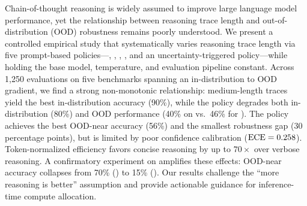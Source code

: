 Chain-of-thought reasoning is widely assumed to improve large language model performance, yet the relationship between reasoning trace length and out-of-distribution (OOD) robustness remains poorly understood. We present a controlled empirical study that systematically varies reasoning trace length via five prompt-based policies---\pnone, \pshort, \pmedium, \plong, and an uncertainty-triggered \padaptive policy---while holding the base model, temperature, and evaluation pipeline constant. Across 1,250 evaluations on five benchmarks spanning an in-distribution to OOD gradient, we find a strong non-monotonic relationship: medium-length traces yield the best in-distribution accuracy (90\%), while the \plong policy degrades both in-distribution (80\%) and OOD performance (40\% on \mathfive vs.\ 46\% for \pshort). The \padaptive policy achieves the best OOD-near accuracy (56\%) and the smallest robustness gap (30 percentage points), but is limited by poor confidence calibration ($\text{ECE} = 0.258$). Token-normalized efficiency favors concise reasoning by up to $70\times$ over verbose reasoning. A confirmatory experiment on \mini amplifies these effects: OOD-near accuracy collapses from 70\% (\pshort) to 15\% (\plong). Our results challenge the ``more reasoning is better'' assumption and provide actionable guidance for inference-time compute allocation.
